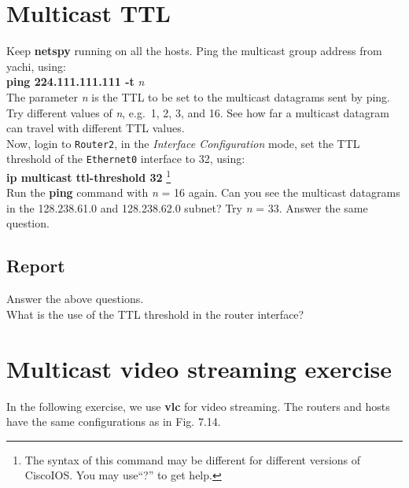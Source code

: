 \documentclass[10pt,a4paper]{article}
\numberwithin{equation}{section}
\numberwithin{figure}{section}
\numberwithin{table}{section}
\begin{document}
\section{Multicast TTL}
    Keep \textbf{netspy} running on all the hosts.
    Ping the multicast group address from yachi, using: \\
    \textbf{ping 224.111.111.111 -t} \textit{n} \\
    The parameter \textit{n} is the TTL to be set to the multicast datagrams sent by ping.
    Try different values of \textit{n}, e.g.\  1, 2, 3, and 16.
    See how far a multicast datagram can travel with different TTL values. \\
    Now, login to \texttt{Router2}, in the \textit{Interface Configuration} mode, set the TTL threshold of the \texttt{Ethernet0} interface to 32, using: \\
    \textbf{ip multicast ttl-threshold 32}
    \footnote{The syntax of this command may be different for different versions of CiscoIOS. You may use“?” to get help.} \\
    Run the \textbf{ping} command with \textit{n} = 16 again.
    Can you see the multicast datagrams in the 128.238.61.0 and 128.238.62.0 subnet?
    Try \textit{n} = 33.
    Answer the same question.
    \subsection*{Report}
    Answer the above questions. \\
    What is the use of the TTL threshold in the router interface?

\section*{Multicast video streaming exercise}
    In the following exercise, we use \textbf{vlc} for video streaming.
    The routers and hosts have the same configurations as in Fig. 7.14.
\end{document}
